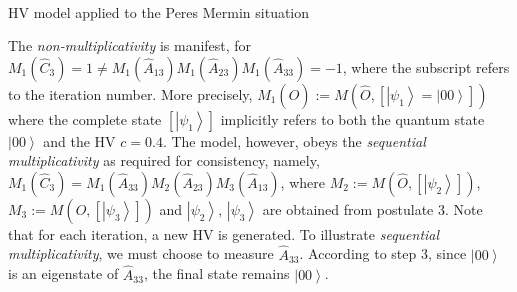 \documentclass[british,aps,prl,superscriptaddress,nofootinbib,times,reprint]{revtex4-1}
\theoremstyle{plain}
\theoremstyle{plain}
\theoremstyle{definition}
\theoremstyle{remark}
\theoremstyle{remark}
\theoremstyle{remark}
\theoremstyle{plain}
\theoremstyle{plain}
\theoremstyle{plain}
\theoremstyle{definition}
\theoremstyle{definition}
\begin{document}
\begin{table}
\begin{equation*}
\begin{array}{ccc}

\label{eq:toyModel}
\end{array}
\end{equation*}
\caption{HV model applied to the Peres Mermin situation}
\label{tbl:HVmodel}
\end{table}
The \emph{non-multiplicativity} is
manifest, for $M_{1}(\hat{C}_{3})=1\neq
M_{1}(\hat{A}_{13})M_{1}(\hat{A}_{23})M_{1}(\hat{A}_{33})=-1$,
where the subscript refers to the iteration
number.  More precisely,
$M_{1}(\hat{O}):=M(\hat{O},\left[\left|\psi_{1}\right\rangle
=\left|00\right\rangle \right])$ where the
complete state $\left[\left|\psi_{1}\right\rangle
\right]$ implicitly refers to both the quantum
state $\left|00\right\rangle $ and the HV $c=0.4$.
The model, however, obeys the \emph{sequential
multiplicativity} as required for consistency,
namely,
$M_{1}(\hat{C}_{3})=M_{1}
(\hat{A}_{33})M_{2}(\hat{A}_{23})M_{3}(\hat{A}_{13})$,
where
$M_{2}:=M(\hat{O},\left[\left|\psi_{2}\right\rangle
\right])$,
$M_{3}:=M(\hat{O},\left[\left|\psi_{3}\right\rangle
\right])$ and $\left|\psi_{2}\right\rangle
,\,\left|\psi_{3}\right\rangle $ are obtained from
postulate 3. Note that for each iteration, a new
HV is generated. To illustrate \emph{sequential
multiplicativity}, we must choose to measure
$\hat{A}_{33}$. According to step 3, since
$\left|00\right\rangle $ is an eigenstate of
$\hat{A}_{33}$, the final state remains
$\left|00\right\rangle $.  
\end{document}
